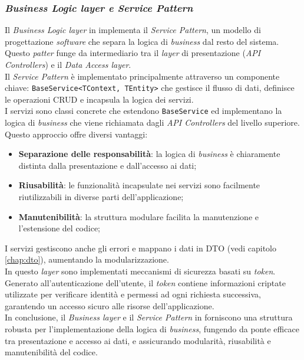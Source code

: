\subsubsection{\textit{Business Logic layer e Service Pattern}}

Il \textit{Business Logic layer} in {\movi} implementa il \textit{Service Pattern}, un modello di progettazione 
\textit{software} che separa la logica di \textit{business} dal resto del sistema. Questo \textit{patter} funge 
da intermediario tra il \textit{layer} di presentazione (\textit{API Controllers}) e il \textit{Data Access layer}.\\
Il \textit{Service Pattern} è implementato principalmente attraverso un componente chiave: \texttt{BaseService<TContext, TEntity>} 
che gestisce il flusso di dati, definisce le operazioni CRUD e incapsula la logica dei servizi.\\
I servizi sono classi concrete che estendono \texttt{BaseService} ed implementano la logica di \textit{business} 
che viene richiamata dagli \textit{API Controllers} del livello superiore.\\
Questo approccio offre diversi vantaggi:
\begin{itemize}
\item \textbf{Separazione delle responsabilità}: la logica di \textit{business} è chiaramente distinta dalla 
      presentazione e dall'accesso ai dati;
\item \textbf{Riusabilità}: le funzionalità incapsulate nei servizi sono facilmente riutilizzabili in diverse 
      parti dell'applicazione;
\item \textbf{Manutenibilità}: la struttura modulare facilita la manutenzione e l'estensione del codice;
\end{itemize}
I servizi gestiscono anche gli errori e mappano i dati in DTO (vedi capitolo \ref{chap:dto}), aumentando la 
modularizzazione.\\
In questo \textit{layer} sono implementati meccanismi di sicurezza basati su \textit{token}. Generato all'autenticazione 
dell'utente, il \textit{token} contiene informazioni criptate utilizzate per verificare identità e permessi ad ogni richiesta 
successiva, garantendo un accesso sicuro alle risorse dell'applicazione.\\
In conclusione, il \textit{Business layer} e il \textit{Service Pattern} in {\movi} forniscono una struttura robusta 
per l'implementazione della logica di \textit{business}, fungendo da ponte efficace tra presentazione e accesso ai 
dati, e assicurando modularità, riusabilità e manutenibilità del codice.